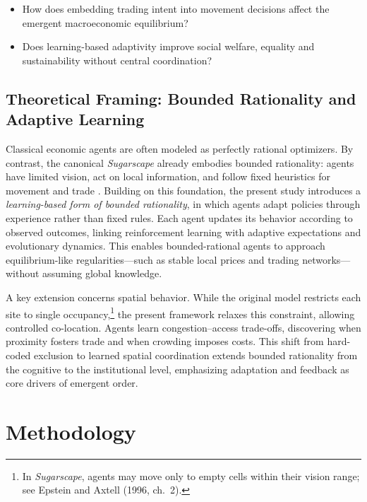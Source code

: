 \documentclass[pdflatex,sn-mathphys-num]{sn-jnl}%
\theoremstyle{thmstyleone}%
\theoremstyle{thmstyletwo}%
\theoremstyle{thmstylethree}%
\begin{document}
\begin{itemize}
    \item[(i)] How does embedding trading intent into movement decisions affect the emergent macroeconomic equilibrium?
    \item[(ii)] Does learning-based adaptivity improve social welfare, equality and sustainability without central coordination?
\end{itemize}

\subsection{Theoretical Framing: Bounded Rationality and Adaptive Learning}

Classical economic agents are often modeled as perfectly rational optimizers.  
By contrast, the canonical \textit{Sugarscape} already embodies bounded rationality: agents have limited vision, act on local information, and follow fixed heuristics for movement and trade \citep{EpsteinAxtell1996}.  
Building on this foundation, the present study introduces a \textit{learning-based form of bounded rationality}, in which agents adapt policies through experience rather than fixed rules.  
Each agent updates its behavior according to observed outcomes, linking reinforcement learning with adaptive expectations and evolutionary dynamics.  
This enables bounded-rational agents to approach equilibrium-like regularities---such as stable local prices and trading networks---without assuming global knowledge.

A key extension concerns spatial behavior.  
While the original model restricts each site to single occupancy,\footnote{In \textit{Sugarscape}, agents may move only to empty cells within their vision range; see Epstein and Axtell (1996, ch.~2).}  
the present framework relaxes this constraint, allowing controlled co-location.  
Agents learn congestion--access trade-offs, discovering when proximity fosters trade and when crowding imposes costs.  
This shift from hard-coded exclusion to learned spatial coordination extends bounded rationality from the cognitive to the institutional level, emphasizing adaptation and feedback as core drivers of emergent order.


\section{Methodology}
\label{sec:methodology}
\end{document}

